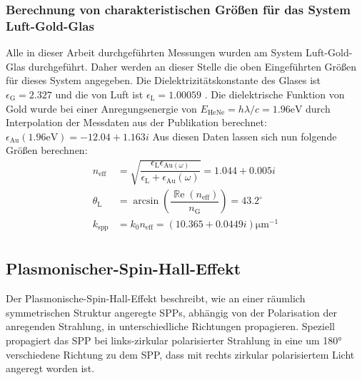 \documentclass{article}
\begin{document}
		\subsubsection{Berechnung von charakteristischen Größen für das System Luft-Gold-Glas}
		Alle in dieser Arbeit durchgeführten Messungen wurden am System Luft-Gold-Glas durchgeführt. Daher werden an dieser Stelle die oben Eingeführten Größen für dieses System angegeben. Die Dielektrizitätskonstante des Glases ist $\epsilon_{\mathrm{G}} = 2.327$ \cite{Zeiss.} und die von Luft ist $\epsilon_{\mathrm{L}} = 1.00059$ \cite{Hippel.1995}. Die dielektrische Funktion von Gold wurde bei einer Anregungsenergie von $E_{\mathrm{HeNe}} = h\lambda/c = 1.96\mathrm{eV} $ durch Interpolation der Messdaten aus der Publikation \cite{Olmon.2012} berechnet: $\epsilon_{\mathrm{Au}}(1.96\mathrm{eV}) = -12.04 +1.163i$ Aus diesen Daten lassen sich nun folgende Größen berechnen:
		\begin{align}
			n_{\mathrm{eff}} &= \sqrt{\dfrac{\epsilon_{\mathrm{L}}\epsilon_{\mathrm{Au}(\omega)}}{\epsilon_{\mathrm{L}} + 	\epsilon_{\mathrm{Au}}(\omega)}} = 	1.044 + 0.005i \\			
			\theta_\mathrm{L} &=  \arcsin\left(\dfrac{\operatorname{\mathbb{R}e}(n_{\mathrm{eff}})}{ n_\mathrm{G}}\right) = 43.2^\circ \\
			k_{\mathrm{spp}} &= k_0 n_{\mathrm{eff}} = (10.365 + 0.0449i)\mathrm{\mu m}^{-1} \\
		\end{align}
	\subsection{Plasmonischer-Spin-Hall-Effekt}
	Der Plasmonische-Spin-Hall-Effekt beschreibt, wie an einer räumlich symmetrischen Struktur angeregte SPPs, abhängig von der Polarisation der anregenden Strahlung, in unterschiedliche Richtungen propagieren. Speziell propagiert das SPP bei links-zirkular polarisierter Strahlung in eine um 180° verschiedene Richtung zu dem SPP, dass mit rechts zirkular polarisiertem Licht angeregt worden ist. 
\end{document}
